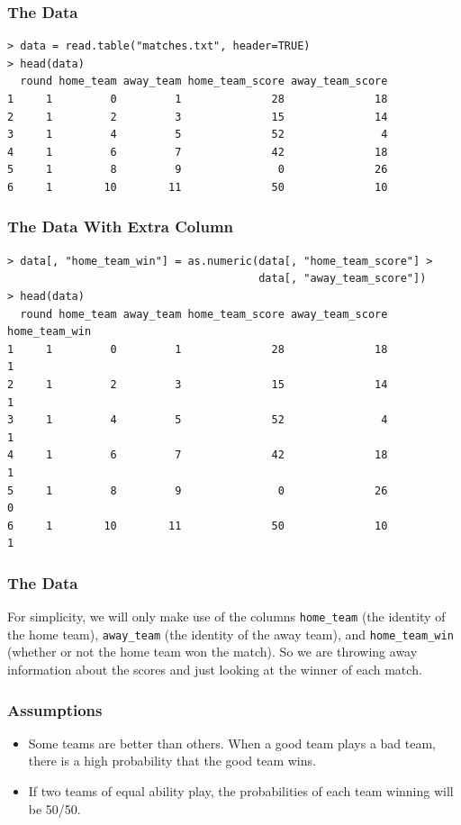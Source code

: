 \documentclass{beamer}
\begin{document}
\begin{frame}[fragile]
\frametitle{The Data}

{\tiny
\begin{verbatim}
> data = read.table("matches.txt", header=TRUE)
> head(data)
  round home_team away_team home_team_score away_team_score
1     1         0         1              28              18
2     1         2         3              15              14
3     1         4         5              52               4
4     1         6         7              42              18
5     1         8         9               0              26
6     1        10        11              50              10
\end{verbatim}
} %

\end{frame}


\begin{frame}[fragile]
\frametitle{The Data With Extra Column}

{\tiny
\begin{verbatim}
> data[, "home_team_win"] = as.numeric(data[, "home_team_score"] >
                                       data[, "away_team_score"])
> head(data)
  round home_team away_team home_team_score away_team_score home_team_win
1     1         0         1              28              18             1
2     1         2         3              15              14             1
3     1         4         5              52               4             1
4     1         6         7              42              18             1
5     1         8         9               0              26             0
6     1        10        11              50              10             1
\end{verbatim}
} %

\end{frame}


\begin{frame}[fragile]
\frametitle{The Data}
For simplicity, we will only make use of the columns
\texttt{home_team} (the identity of the home team),
\texttt{away_team} (the identity of the away team),
and \texttt{home_team_win} (whether or not the home team won the match).
So we are throwing away information about
the scores and just looking at the winner of each match.

\end{frame}


\begin{frame}[fragile]
\frametitle{Assumptions}
\begin{itemize}
\item Some teams are better than others. When a good team plays a bad team, there is a high probability that the good team wins.\pause
\item If two teams of equal ability play, the probabilities of each team winning
will be 50/50.
\end{itemize}
\end{frame}
\end{document}
